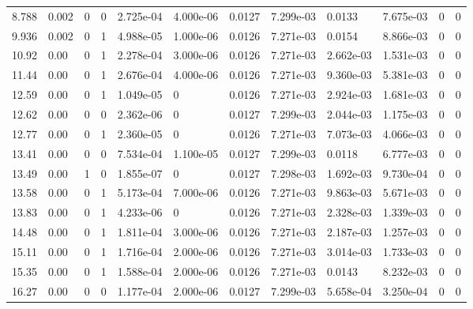\documentclass[preview]{standalone}
\begin{document}
{{\begin{tabular}{L{1.2cm}C{1.2cm} C{0.3cm}C{0.5cm} C{1.4cm}C{1.4cm} C{1.4cm}C{1.4cm} C{1.6cm}C{1.6cm} C{1.6cm}C{1.6cm}}
  8.788  &  0.002  & 0     &  0 &  2.725e-04  & 4.000e-06  &  0.0127&   7.299e-03& 0.0133 & 7.675e-03   &  0 & 0  \\ 
  9.936  &  0.002  & 0     &  1 &  4.988e-05  & 1.000e-06  &  0.0126&   7.271e-03& 0.0154 & 8.866e-03   &  0 & 0  \\ 
  10.92  &  0.00  & 0     &  1 &  2.278e-04  & 3.000e-06  &  0.0126&   7.271e-03& 2.662e-03 & 1.531e-03   &  0 & 0  \\ 
  11.44  &  0.00  & 0     &  1 &  2.676e-04  & 4.000e-06  &  0.0126&   7.271e-03& 9.360e-03 & 5.381e-03   &  0 & 0  \\ 
  12.59  &  0.00  & 0     &  1 &  1.049e-05  & 0  &  0.0126&   7.271e-03& 2.924e-03 & 1.681e-03   &  0 & 0  \\ 
  12.62  &  0.00  & 0     &  0 &  2.362e-06  & 0  &  0.0127&   7.299e-03& 2.044e-03 & 1.175e-03   &  0 & 0  \\ 
  12.77  &  0.00  & 0     &  1 &  2.360e-05  & 0  &  0.0126&   7.271e-03& 7.073e-03 & 4.066e-03   &  0 & 0  \\ 
  13.41  &  0.00  & 0     &  0 &  7.534e-04  & 1.100e-05  &  0.0127&   7.299e-03& 0.0118 & 6.777e-03   &  0 & 0  \\ 
  13.49  &  0.00  & 1     &  0 &  1.855e-07  & 0  &  0.0127&   7.298e-03& 1.692e-03 & 9.730e-04   &  0 & 0  \\ 
  13.58  &  0.00  & 0     &  1 &  5.173e-04  & 7.000e-06  &  0.0126&   7.271e-03& 9.863e-03 & 5.671e-03   &  0 & 0  \\ 
  13.83  &  0.00  & 0     &  1 &  4.233e-06  & 0  &  0.0126&   7.271e-03& 2.328e-03 & 1.339e-03   &  0 & 0  \\ 
  14.48  &  0.00  & 0     &  1 &  1.811e-04  & 3.000e-06  &  0.0126&   7.271e-03& 2.187e-03 & 1.257e-03   &  0 & 0  \\ 
  15.11  &  0.00  & 0     &  1 &  1.716e-04  & 2.000e-06  &  0.0126&   7.271e-03& 3.014e-03 & 1.733e-03   &  0 & 0  \\ 
  15.35  &  0.00  & 0     &  1 &  1.588e-04  & 2.000e-06  &  0.0126&   7.271e-03& 0.0143 & 8.232e-03   &  0 & 0  \\ 
  16.27  &  0.00  & 0     &  0 &  1.177e-04  & 2.000e-06  &  0.0127&   7.299e-03& 5.658e-04 & 3.250e-04   &  0 & 0  \\ 
\hline 
\end{tabular} 

}}
\end{document}
